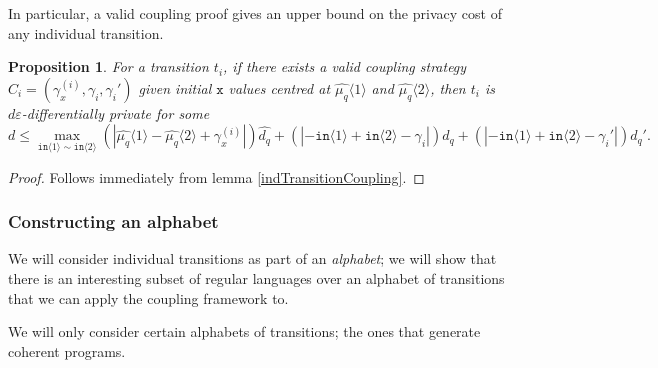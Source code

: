 \documentclass[12pt]{article}
\newcommand{\brangle}[1]{\langle #1 \rangle}
\newtheorem{prop}[thm]{Proposition}
\theoremstyle{definition}
\begin{document}
In particular, a valid coupling proof gives an upper bound on the privacy cost of any individual transition. 
\begin{prop}\label{indivTransitionCouplingProp}
    For a transition $t_i$, if there exists a valid coupling strategy $C_i=(\gamma_x^{(i)}, \gamma_i, \gamma_i')$ given initial $\texttt{x}$ values centred at $\hat{\mu_q}\brangle{1}$ and $\hat{\mu_q}\brangle{2}$, then $t_i$ is $d\varepsilon$-differentially private for some 
    \[d\leq \max_{\texttt{in}\brangle{1}\sim\texttt{in}\brangle{2}} (|\hat{\mu_q}\brangle{1}-\hat{\mu_q}\brangle{2}+\gamma_x^{(i)}|)\hat{d_q}+(|-\texttt{in}\brangle{1}+\texttt{in}\brangle{2}-\gamma_i|)d_q+(|-\texttt{in}\brangle{1}+\texttt{in}\brangle{2}-\gamma_i'|)d_q'.\]
\end{prop}
\begin{proof}
    Follows immediately from lemma \ref{indTransitionCoupling}.
\end{proof}

\subsubsection{Constructing an alphabet}

We will consider individual transitions as part of an \textit{alphabet}; we will show that there is an interesting subset of regular languages over an alphabet of transitions that we can apply the coupling framework to. 

We will only consider certain alphabets of transitions; the ones that generate coherent programs. 
\end{document}
